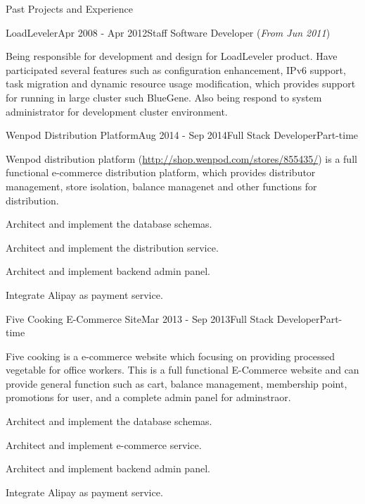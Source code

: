 \documentclass{resume} %
\newcommand{\http}{http:/\hspace{-0.3ex}/}
\begin{document}
\begin{rSection}{Past Projects and Experience}
\begin{rSubsection}{LoadLeveler}{Apr 2008 - Apr 2012}{Staff Software Developer (\textit{From Jun 2011})}{}

Being responsible for development and design for LoadLeveler product. Have participated several features such as configuration enhancement, IPv6 support, task migration and dynamic resource usage modification, which provides support for running in large cluster such BlueGene. Also being respond to system administrator for development cluster environment.

\end{rSubsection}



\begin{rSubsection}{Wenpod Distribution Platform}{Aug 2014 - Sep 2014}{Full Stack Developer}{Part-time}

Wenpod distribution platform (\href{http://shop.wenpod.com/stores/855435/}{\http{}shop.wenpod.com/stores/855435/}) is a full functional e-commerce distribution platform, which provides distributor management, store isolation, balance managenet and other functions for distribution.

\begin{rSubsectionList}
\item Architect and implement the database schemas.
\item Architect and implement the distribution service.
\item Architect and implement backend admin panel.
\item Integrate Alipay as payment service.
\end{rSubsectionList}
\end{rSubsection}



\begin{rSubsection}{Five Cooking E-Commerce Site}{Mar 2013 - Sep 2013}{Full Stack Developer}{Part-time}

Five cooking is a e-commerce website which focusing on providing processed vegetable for office workers. This is a full functional E-Commerce website and can provide general function such as cart, balance management, membership point, promotions for user, and a complete admin panel for adminstraor.

\begin{rSubsectionList}
\item Architect and implement the database schemas.
\item Architect and implement e-commerce service.
\item Architect and implement backend admin panel.
\item Integrate Alipay as payment service.
\end{rSubsectionList}
\end{rSubsection}



\end{rSection}
\end{document}
